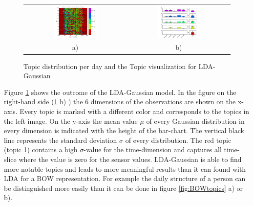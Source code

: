 \begin{figure}
 \centering
 \begin{tabular}{c c}
  \centering
  \includegraphics[width=0.45\textwidth]{Pictures/TopDayHN3TS96k5Gaus.png}
  &
  \includegraphics[width=0.45\textwidth]{Pictures/TopVisuHN3TS96k5Gaus.png}\\
    a) & b)
 \end{tabular}
 \caption{Topic distribution per day and the Topic visualization for LDA-Gaussian}
 \label{fig:Gaus96}
\end{figure}  

Figure \ref{fig:Gaus96} shows the outcome of the LDA-Gaussian model. In the figure on the right-hand side (\ref{fig:Gaus96} b) ) the 6 dimensions of the observations are shown on the x-axis. Every topic is marked with a different color and corresponds to the topics in the left image. On the y-axis the mean value $\mu$ of every Gaussian distribution in every dimension is indicated with the height of the bar-chart. The vertical black line represents the standard deviation $\sigma$ of every distribution. The red topic (topic 1) contains a high $\sigma$-value for the time-dimension and captures all time-slice where the value is zero for the sensor values. LDA-Gaussian is able to find more notable topics and leads to more meaningful results than it can found with LDA for a BOW representation. For example the daily structure of a person can be distinguished more easily than it can be done in figure \ref{fig:BOWtopics} a) or b).\\

